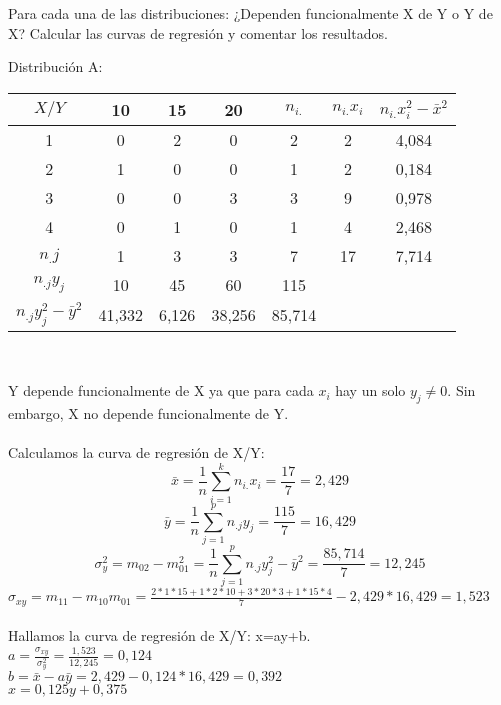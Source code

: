 \problem
Para cada una de las distribuciones: ¿Dependen funcionalmente X de Y o Y de X? Calcular las curvas de regresión y comentar los resultados.

    Distribución A: 
    \begin{center}
    \begin{tabular}{| c | c | c | c | c | c | c |}
        \hline
        $X / Y$ & 10 & 15 & 20 & $n_{i.}$ & $n_{i.}x_i$ & $n_{i.}x_i^2 - \bar{x}^2$ \\ \hline
        1 & 0 & 2 & 0 & 2 & 2 & 4,084 \\ \hline
        2 & 1 & 0 & 0 & 1 & 2 & 0,184 \\ \hline
        3 & 0 & 0 & 3 & 3 & 9 & 0,978 \\ \hline
        4 & 0 & 1 & 0 & 1 & 4 & 2,468 \\ \hline
        $n_.j$ & 1 & 3 & 3 & 7 & 17 & 7,714\\   \hline
        $n_{.j}y_j$ & 10 & 45 & 60 & 115 & & \\ \hline
        $n_{.j}y_j^2 - \bar{y}^2$ & 41,332 & 6,126 & 38,256 & 85,714 & & \\
        \hline
    \end{tabular} \\ 
    \end{center}
    Y depende funcionalmente de X ya que para cada $x_i$ hay un solo $y_j\neq 0$. Sin embargo, X no depende funcionalmente de Y. \\ \\
    Calculamos la curva de regresión de X/Y: 
    \[\bar{x} = \frac{1}{n}\sum_{i=1}^{k}n_{i.}x_i = \frac{17}{7} = 2,429 \]
    \[\bar{y} = \frac{1}{n}\sum_{j=1}^{p}n_{.j}y_j = \frac{115}{7} = 16,429 \]
    \[\sigma_y^2 = m_{02}-m_{01}^2 = \frac{1}{n}\sum_{j=1}^{p}n_{.j}y_j^2-\bar{y}^2 = \frac{85,714}{7} = 12,245\]
    $\sigma_{xy} = m_{11}-m_{10}m_{01} = \frac{2*1*15+1*2*10+3*20*3+1*15*4}{7} - 2,429*16,429 = 1,523$ \\ \\
    Hallamos la curva de regresión de X/Y: x=ay+b. \\
    $a = \frac{\sigma_{xy}}{\sigma_y^2} = \frac{1,523}{12,245} = 0,124$ \\
    $b = \bar{x}-a\bar{y} = 2,429 - 0,124*16,429 = 0,392$ \\
    $x=0,125y + 0,375$ \\ \\ 
    
